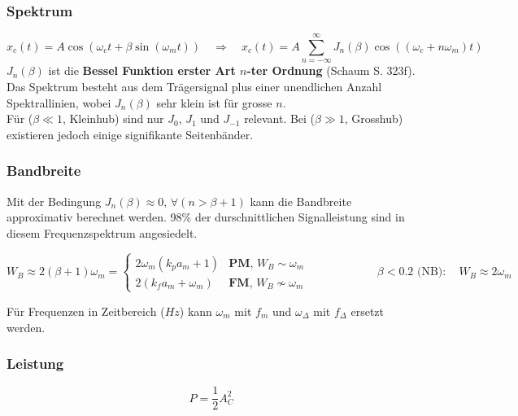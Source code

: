 \subsubsection{Spektrum}
$$x_c(t) = A \cos(\omega_c t + \beta \sin(\omega_m t)) \quad \Rightarrow \quad 
x_c(t) = A \sum\limits_{n=-\infty}^{\infty} J_n(\beta) \cos((\omega_c + n \omega_m)t)$$
\textbf{$J_n(\beta)$} ist die \textbf{Bessel Funktion erster Art $n$-ter Ordnung} (Schaum
S. 323f). Das Spektrum besteht aus dem Trägersignal plus einer unendlichen Anzahl Spektrallinien,
wobei $J_n(\beta)$ sehr klein ist für grosse $n$. \\
Für ($\beta \ll 1$, Kleinhub) sind nur $J_0$, $J_1$ und $ J_{-1}$ relevant. Bei ($\beta \gg 1$,
Grosshub) existieren jedoch einige signifikante Seitenbänder.

\subsubsection{Bandbreite}
Mit der Bedingung $J_n(\beta) \approx 0, \,\forall (n > \beta + 1)$ kann die Bandbreite approximativ
berechnet werden. 98\% der durschnittlichen Signalleistung sind in diesem
Frequenzspektrum angesiedelt. 

\begin{center}
$W_B \approx 2(\beta + 1) \omega_m = 
	\begin{cases}
  		2 \omega_m (k_p a_m + 1) & \textbf{PM},\, W_B \sim \omega_m \\
  		2(k_f a_m + \omega_m) & \textbf{FM},\, W_B \nsim \omega_m \end{cases} \qquad
  		\qquad \qquad \beta < 0.2 \text{ (NB)}: \quad W_{B} \approx 2 \omega_m
$
\end{center}
F\"ur Frequenzen in Zeitbereich ($Hz$) kann $\omega_m$ mit $f_m$ und
$\omega_{\Delta}$ mit $f_{\Delta}$ ersetzt werden.\\
\subsubsection{Leistung }
$$P = \frac12 A_C^2$$



